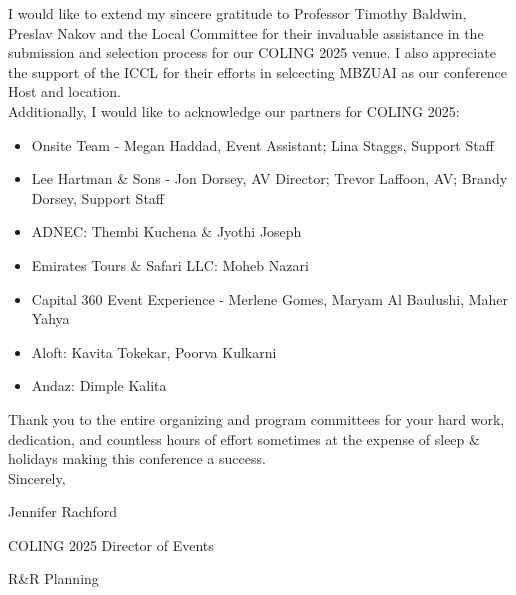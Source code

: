 I would like to extend my sincere gratitude to Professor Timothy Baldwin, Preslav Nakov and the Local Committee for their invaluable assistance in the submission and selection process for our COLING 2025 venue. I also appreciate the support of the ICCL for their efforts in selcecting MBZUAI as our conference Host and location. \\

Additionally, I would like to acknowledge our partners for COLING 2025:
\begin{itemize}[noitemsep]
    \item Onsite Team - Megan Haddad, Event Assistant; Lina Staggs, Support Staff 
    \item Lee Hartman \& Sons - Jon Dorsey, AV Director;  Trevor Laffoon, AV; Brandy Dorsey, Support Staff
    \item ADNEC: Thembi Kuchena \& Jyothi Joseph
    \item Emirates Tours \& Safari LLC: Moheb Nazari 
    \item Capital 360 Event Experience -  Merlene Gomes, Maryam Al Baulushi, Maher Yahya 
    \item Aloft: Kavita Tokekar, Poorva Kulkarni
    \item Andaz: Dimple Kalita 
\end{itemize}

Thank you to the entire organizing and program committees for your hard work, dedication, and countless hours of effort sometimes at the expense of sleep \& holidays making this conference a success. \\

Sincerely,

Jennifer Rachford 

COLING 2025 Director of Events

R\&R Planning 
